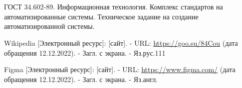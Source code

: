 \documentclass[14pt]{extreport}
\begin{document}
\pagestyle{empty} %


\pagestyle{plain} %
\tableofcontents

\intro

\chapter{}

\chapter{}

\chapter{}

\chapter{}

\conclusions

\begin{thebibliography}{2}

 ГОСТ 34.602-89. Информационная технология. Комплекс стандартов на автоматизированные системы. Техническое задание на создание автоматизированной системы.

 Wikipedia [Электронный ресурс]: [сайт]. - URL: \url{https://goo.su/84Cou} (дата обращения 12.12.2022). - Загл. с экрана. - Яз.рус.111

 Figma [Электронный ресурс]: [сайт]. - URL: \url{https://www.figma.com/} (дата обращения 12.12.2022). - Загл. с экрана. - Яз.англ.

\end{thebibliography}
\end{document}
